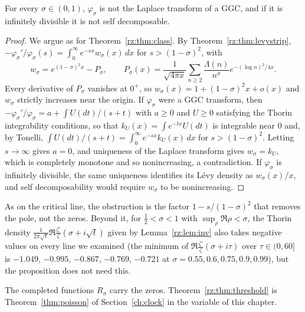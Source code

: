 \begin{proposition}\label{rz:prop:onlyhalf}
For every $\sigma\in(0,1)$, $\varphi_\sigma$ is not the Laplace transform of a GGC, and if it is infinitely divisible it is not self decomposable.
\end{proposition}

\begin{proof}
We argue as for Theorem~\ref{rz:thm:class}. By Theorem~\ref{rz:thm:levystrip}, $-\varphi_\sigma'/\varphi_\sigma(s)=\int_0^\infty e^{-sx}w_\sigma(x)\,dx$ for $s>(1-\sigma)^2$, with
\[
w_\sigma=e^{(1-\sigma)^2x}-P_\sigma,\qquad P_\sigma(x)=\frac1{\sqrt{4\pi x}}\sum_{n\ge2}\frac{\Lambda(n)}{n^\sigma}e^{-(\log n)^2/4x}.
\]
Every derivative of $P_\sigma$ vanishes at $0^+$, so $w_\sigma(x)=1+(1-\sigma)^2x+o(x)$ and $w_\sigma$ strictly increases near the origin. If $\varphi_\sigma$ were a GGC transform, then $-\varphi_\sigma'/\varphi_\sigma=a+\int U(dt)/(s+t)$ with $a\ge0$ and $U\ge0$ satisfying the Thorin integrability conditions, so that $k_U(x)=\int e^{-tx}U(dt)$ is integrable near $0$ and, by Tonelli, $\int U(dt)/(s+t)=\int_0^\infty e^{-sx}k_U(x)\,dx$ for $s>(1-\sigma)^2$. Letting $s\to\infty$ gives $a=0$, and uniqueness of the Laplace transform gives $w_\sigma=k_U$, which is completely monotone and so nonincreasing, a contradiction. If $\varphi_\sigma$ is infinitely divisible, the same uniqueness identifies its L\'evy density as $w_\sigma(x)/x$, and self decomposability would require $w_\sigma$ to be nonincreasing.
\end{proof}

As on the critical line, the obstruction is the factor $1-s/(1-\sigma)^2$ that removes the pole, not the zeros. Beyond it, for $\frac12<\sigma<1$ with $\sup_\rho\Re\rho<\sigma$, the Thorin density $\frac{1}{2\pi\sqrt t}\Re\frac{\zeta'}{\zeta}(\sigma+i\sqrt t)$ given by Lemma~\ref{rz:lem:inv} also takes negative values on every line we examined (the minimum of $\Re\frac{\zeta'}{\zeta}(\sigma+i\tau)$ over $\tau\in(0,60]$ is $-1.049$, $-0.995$, $-0.867$, $-0.769$, $-0.721$ at $\sigma=0.55,0.6,0.75,0.9,0.99$), but the proposition does not need this.

The completed functions $R_\sigma$ carry the zeros. Theorem~\ref{rz:thm:threshold} is Theorem~\ref{thm:poisson} of Section~\ref{ch:clock} in the variable of this chapter.

